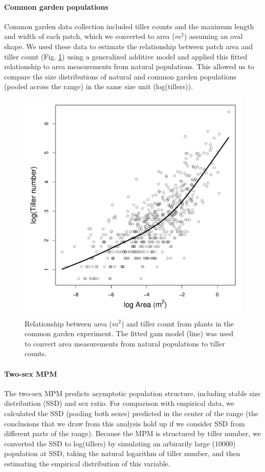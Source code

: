 \documentclass[11pt]{article}
\begin{document}
\paragraph{Common garden populations}
Common garden data collection included tiller counts and the maximum length and width of each patch, which we converted to area ($m^2$) assuming an oval shape. 
We used these data to estimate the relationship between patch area and tiller count (Fig. \ref{fig:area_tillers_conversion}) using a generalized additive model \citep{mgcv} and applied this fitted relationship to area measurements from natural populations.
This allowed us to compare the size distributions of natural and common garden populations (pooled across the range) in the same size unit (log(tillers)).

\newpage
\begin{figure}[H]
	\begin{center}
		\includegraphics[width=0.75\linewidth]{Figures/area_tillers_conversion}
		\caption{Relationship between area ($m^2$) and tiller count from plants in the common garden experiment. 
			The fitted gam model (line) was used to convert area measurements from natural populations to tiller counts.}
		\label{fig:area_tillers_conversion}
	\end{center}
\end{figure}

\paragraph{Two-sex MPM}
The two-sex MPM predicts asymptotic population structure, including stable size distribution (SSD) and sex ratio. 
For comparison with empirical data, we calculated the SSD (pooling both sexes) predicted in the center of the range (the conclusions that we draw from this analysis hold up if we consider SSD from different parts of the range).
Because the MPM is structured by tiller number, we converted the SSD to log(tillers) by simulating an arbirarily large ($10000$) population at SSD, taking the natural logarithm of tiller number, and then estimating the empirical distribution of this variable. 
\end{document}

